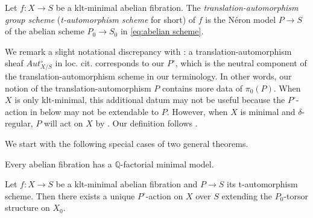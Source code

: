 \documentclass[reqno, letterpaper]{amsart}
\numberwithin{equation}{subsection}
\let\to\longrightarrow
\newcommand{\QQ}{\mathbb{Q}}
\begin{document}
		\begin{definition} \label{def:t-automorphism scheme}
			Let $f : X \to S$ be a klt-minimal abelian fibration. The \emph{translation-automorphism group scheme} (\emph{t-automorphism scheme} for short) of $f$ is the N\'eron model $P \to S$ of the abelian scheme $P_0 \to S_0$ in \eqref{eq:abelian scheme}.
		\end{definition}
		
		\begin{remark}
			We remark a slight notational discrepancy with \cite[Definition~24]{kol25:TS}: a translation-automorphism sheaf $Aut^\circ_{X/S}$ in loc. cit. corresponds to our $P^\circ$, which is the neutral component of the translation-automorphism scheme in our terminology. In other words, our notion of the translation-automorphism $P$ contains more data of $\pi_0(P)$. When $X$ is only klt-minimal, this additional datum may not be useful because the $P^\circ$-action in  below may not be extendable to $P$. However, when $X$ is minimal and $\delta$-regular, $P$ will act on $X$ by . Our definition follows \cite[Definition~4.1]{kim24}.
		\end{remark}
		
		We start with the following special cases of two general theorems.
		
		\begin{theorem} \label{thm:minimal model}
			Every abelian fibration has a $\QQ$-factorial minimal model.
		\end{theorem}
		
		\begin{theorem}  \label{thm:Po-action}
			Let $f : X \to S$ be a klt-minimal abelian fibration and $P \to S$ its t-automorphism scheme. Then there exists a unique $P^\circ$-action on $X$ over $S$ extending the $P_0$-torsor structure on $X_0$.
		\end{theorem}
		
\end{document}
